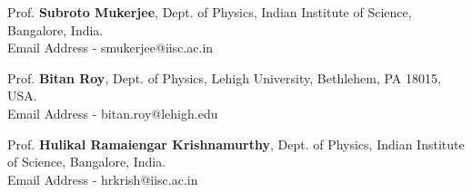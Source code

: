 

\begin{cventries}


\begin{cvitems}

  \item{Prof. \textbf{Subroto Mukerjee},} %
	{Dept. of Physics, Indian Institute of Science, Bangalore, India.} %
	{} %
	{\\}
	{Email Address - smukerjee@iisc.ac.in} %
  \item{Prof. \textbf{Bitan Roy},} %
	{Dept. of Physics, Lehigh University, Bethlehem, PA 18015, USA.} %
	{} %
	{\\}
	{Email Address - bitan.roy@lehigh.edu} %

  \item{Prof. \textbf{Hulikal Ramaiengar Krishnamurthy},} %
	{Dept. of Physics, Indian Institute of Science, Bangalore, India.} %
    {} %
    {\\}
    {Email Address - hrkrish@iisc.ac.in} %

\end{cvitems}
\end{cventries}
